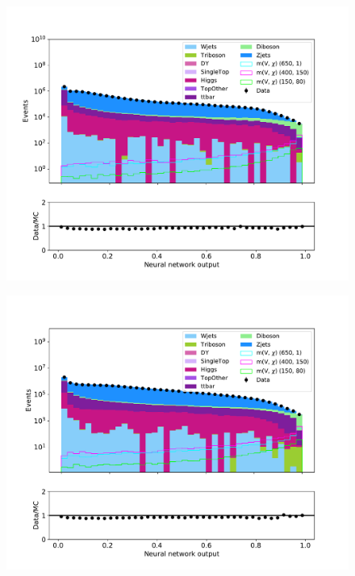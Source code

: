 \begin{figure}[H]
    \centering
        \includegraphics[width = \textwidth]{Figures/Stacked/stackedplot_NN_Low_level_monoZ.pdf}
        \caption{}
        \label{fig:traintestscaled}
\end{figure}

\begin{figure}[H]
    \centering
        \includegraphics[width = \textwidth]{Figures/Stacked/stackedplot_NN_High_level_monoZ.pdf}
        \caption{}
        \label{fig:traintestscaled}
\end{figure}



























